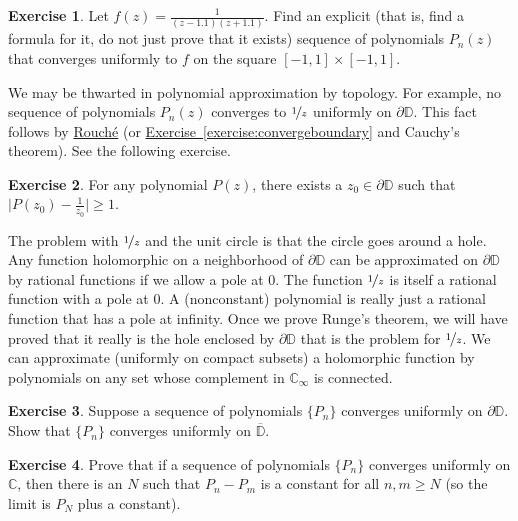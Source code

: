 \documentclass[12pt,openany]{book}
\newcommand{\babs}[1]{\bigl\lvert {#1} \bigr\rvert}
\newcommand{\C}{{\mathbb{C}}}
\newcommand{\D}{{\mathbb{D}}}
\theoremstyle{plain}
\theoremstyle{remark}
\theoremstyle{definition}
\newenvironment{exbox}{%
    \def\FrameCommand{\vrule width 1pt \relax\hspace{10pt}}%
    \MakeFramed{\advance\hsize-\width\FrameRestore}%
}{%
    \endMakeFramed
}
\theoremstyle{exercise}
\newtheorem{exercise}{Exercise}[section]
\theoremstyle{example}
\newcommand{\exerciseref}[1]{\hyperref[#1]{Exercise~\ref*{#1}}}
\begin{document}
\begin{exbox}
\begin{exercise}
Let 
$f(z) = \frac{1}{(z-1.1)(z+1.1)}$.  Find an explicit (that is, find a
formula for it, do not just prove that it exists) sequence of polynomials
$P_n(z)$
that converges uniformly to $f$ on the square $[-1,1] \times [-1,1]$.
\end{exercise}
\end{exbox}

We may be thwarted in polynomial approximation by topology.
For example, no sequence of
polynomials $P_n(z)$ converges to $\nicefrac{1}{z}$ uniformly on $\partial
\D$.  This fact follows by \hyperref[thm:rouche]{Rouch\'e} (or
\exerciseref{exercise:convergeboundary} and Cauchy's theorem).
See the
following exercise.

\begin{exbox}
\begin{exercise}
For any polynomial $P(z)$, there exists a $z_0 \in \partial \D$ such that
$\babs{P(z_0)-\frac{1}{z_0}} \geq 1$.
\end{exercise}
\end{exbox}

The problem with $\nicefrac{1}{z}$ and the unit circle is that the circle goes around a hole.
Any function holomorphic on a neighborhood of $\partial \D$ can be
approximated on $\partial \D$ by rational functions
if we allow a pole at $0$.  The function $\nicefrac{1}{z}$ is
itself a rational function with a pole at $0$.
A (nonconstant) polynomial is really just a rational function that has a pole at infinity.
Once we prove Runge's theorem, we will have proved that it really is the hole
enclosed by
$\partial \D$
that is the problem for $\nicefrac{1}{z}$.
We can approximate (uniformly on compact subsets) a holomorphic function
by polynomials on any set whose complement in $\C_\infty$ is connected.

\begin{exbox}
\begin{exercise}
Suppose a sequence of polynomials $\{ P_n \}$ converges uniformly on
$\partial \D$.  Show that $\{ P_n \}$ converges uniformly on
$\overline{\D}$.
\end{exercise}

\begin{exercise}
Prove that if a sequence of polynomials $\{ P_n \}$ converges uniformly on
$\C$,
then there is an $N$ such that $P_n - P_m$ is a constant for all $n,m \geq N$
(so the limit is $P_N$ plus a constant).
\end{exercise}
\end{exbox}
\end{document}
